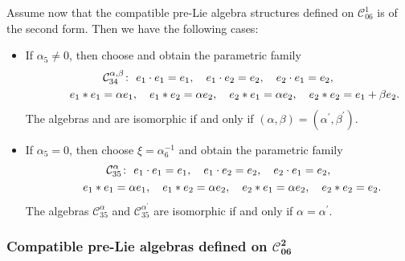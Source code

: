 \documentclass[10pt,a4paper]{amsart}
\numberwithin{equation}{section}
\begin{document}
Assume now that the compatible pre-Lie algebra structures
defined on $\mathcal{C}_{06}^{1}$ is of the second form. Then we have the
following cases:
\begin{itemize}\itemsep=0pt
\item If $\alpha _{5}\neq 0$, then choose 
and obtain the parametric family
\begin{gather*}
\mathcal{C}_{34}^{\alpha ,\beta } \colon \
e_{1}\cdot e_{1}=e_{1},\quad e_{1}\cdot e_{2}=e_{2},\quad e_{2}\cdot
e_{1}=e_{2}, \\
\hphantom{\mathcal{C}_{34}^{\alpha ,\beta } \colon} \
e_{1}\ast e_{1}=\alpha e_{1},\quad e_{1}\ast e_{2}=\alpha e_{2},\quad
e_{2}\ast e_{1}=\alpha e_{2},\quad e_{2}\ast e_{2}=e_{1}+\beta e_{2}.
\end{gather*}
The algebras \smash{$\mathcal{C}_{34}^{\alpha ,\beta }$} and  are isomorphic if and only if $(\alpha,\beta)= (\alpha^{\prime },\beta ^{\prime })$.

\item If $\alpha _{5}=0$, then choose $\xi = {\alpha^{-1} _{6}}$ and
obtain the parametric family
\begin{gather*}
\mathcal{C}_{35}^{\alpha } \colon \
e_{1}\cdot e_{1}=e_{1},\quad e_{1}\cdot e_{2}=e_{2},\quad e_{2}\cdot
e_{1}=e_{2}, \\
\hphantom{\mathcal{C}_{35}^{\alpha } \colon} \
e_{1}\ast e_{1}=\alpha e_{1},\quad e_{1}\ast e_{2}=\alpha e_{2},\quad
e_{2}\ast e_{1}=\alpha e_{2},\quad e_{2}\ast e_{2}=e_{2}.
\end{gather*}
The algebras $\mathcal{C}_{35}^{\alpha }$ and $\mathcal{C}_{35}^{\alpha ^{\prime }}
$ are isomorphic if and only if $\alpha =\alpha ^{\prime }$.
\end{itemize}

\subsubsection[Compatible pre-Lie algebras defined on C\_\{06\}\^{}2]{Compatible pre-Lie algebras defined on $\boldsymbol{\mathcal{C}_{06}^{2}}$}
\end{document}

